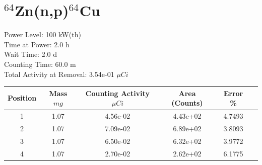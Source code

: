 \newpage

\section*{ $^{64}$Zn(n,p)$^{64}$Cu }

Power Level: 100 kW(th) \\
Time at Power:  2.0 h \\
Wait Time:  2.0 d \\
Counting Time: 60.0 m \\
Total Activity at Removal: 3.54e-01 $\mu Ci$

\begin{table}[h]
\centering
\begin{tabular}{ |c|c|c|c|c|c| }
 \hline
 Position & Mass $mg$ & Counting Activity $\mu Ci$ & Area (Counts) & Error \% \\
 \hline 
 1 & 1.07 & 4.56e-02 & 4.43e+02 & 4.7493 \\ 
\hline
 2 & 1.07 & 7.09e-02 & 6.89e+02 & 3.8093 \\ 
\hline
 3 & 1.07 & 6.50e-02 & 6.32e+02 & 3.9772 \\ 
\hline
 4 & 1.07 & 2.70e-02 & 2.62e+02 & 6.1775 \\ 
\hline
\end{tabular}
\end{table}

